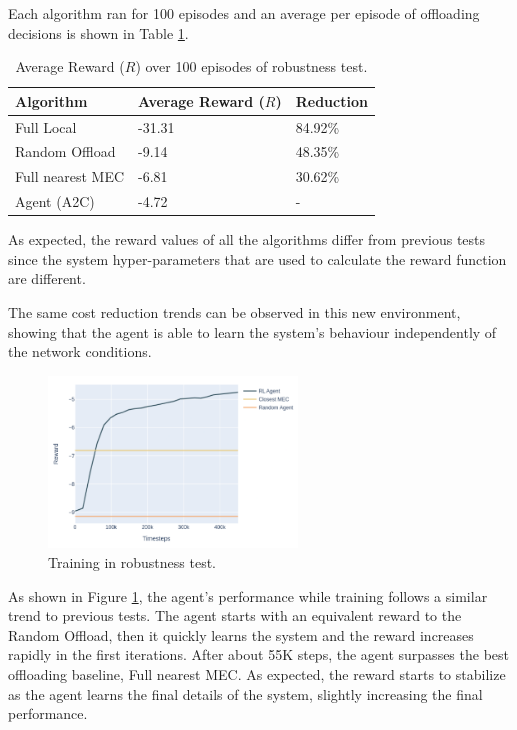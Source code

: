 Each algorithm ran for 100 episodes and an average per episode of offloading decisions is shown in Table \ref{robust_table}.

\begin{table}[H]
\centering
\begin{tabular}{|l|l|l|}
\hline
Algorithm        & Average Reward ($R$) & Reduction\\ \hline
Full Local       & -31.31 & 84.92\%\\
Random Offload   & -9.14 & 48.35\%\\
Full nearest MEC & -6.81 & 30.62\%\\ 
Agent (A2C) & -4.72 & -\\ \hline
\end{tabular}
\caption{Average Reward ($R$) over 100 episodes of robustness test.} \label{robust_table}
\end{table}

As expected, the reward values of all the algorithms differ from previous tests since the system hyper-parameters that are used to calculate the reward function are different.

The same cost reduction trends can be observed in this new environment, showing that the agent is able to learn the system's behaviour independently of the network conditions.

\begin{figure}[H]
  \centering
  \includegraphics[width=250px]{images/5_10_training_new.png}
  \caption{Training in robustness test.}  \label{robust_training}
\end{figure}

As shown in Figure \ref{robust_training}, the agent's performance while training follows a similar trend to previous tests. The agent starts with an equivalent reward to the Random Offload, then it quickly learns the system and the reward increases rapidly in the first iterations. After about 55K steps, the agent surpasses the best offloading baseline, Full nearest MEC. As expected, the reward starts to stabilize as the agent learns the final details of the system, slightly increasing the final performance.

